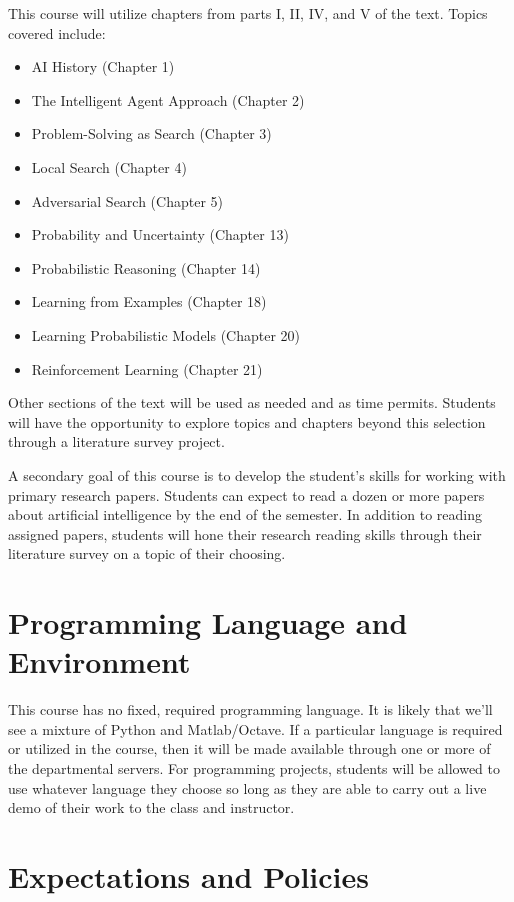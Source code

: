 \documentclass[]{tufte-handout}
\begin{document}
This course will utilize chapters from parts I, II, IV, and V of the text. Topics covered include:
\begin{itemize}
\item AI History (Chapter 1) %
\item The Intelligent Agent Approach (Chapter 2) %
\item Problem-Solving as Search (Chapter 3) %
\item Local Search (Chapter 4) %
\item Adversarial Search (Chapter 5) %
\item Probability and Uncertainty (Chapter 13) %
\item Probabilistic Reasoning (Chapter 14) %
\item Learning from Examples (Chapter 18) %
\item Learning Probabilistic Models (Chapter 20) %
\item Reinforcement Learning (Chapter 21) %
\end{itemize}
Other sections of the text will be used as needed and as time permits.  Students will have the opportunity to explore topics and chapters beyond this selection through a literature survey project.

A secondary goal of this course is to develop the student's skills for working with primary research papers.  Students can expect to read a dozen or more papers about artificial intelligence by the end of the semester. In addition to reading assigned papers, students will hone their research reading skills through their literature survey on a topic of their choosing.

\section{Programming Language and Environment}

This course has no fixed, required programming language. It is likely that we'll see a mixture of  Python and Matlab/Octave. If a particular language is required or utilized in the course, then it will be made available through one or more of the departmental servers. For programming projects, students will be allowed to use whatever language they choose so long as they are able to carry out a live demo  of their work to the class and instructor.

\section{Expectations and Policies}
\end{document}
